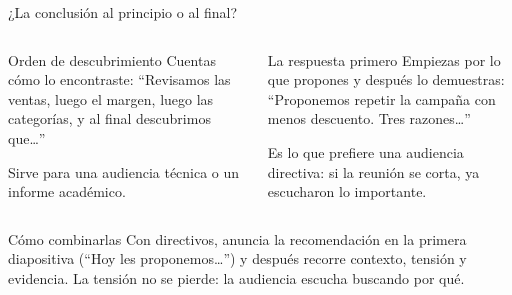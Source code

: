 \documentclass[aspectratio=169,11pt]{beamer}
\begin{document}
\begin{frame}[t]{¿La conclusión al principio o al final?}
  \begin{columns}[T,onlytextwidth]
    \begin{block}{Orden de descubrimiento}
      \footnotesize Cuentas cómo lo encontraste: ``Revisamos las ventas,
      luego el margen, luego las categorías, y al final descubrimos
      que\ldots''
      \vspace{3pt}

      Sirve para una audiencia técnica o un informe académico.
    \end{block}
    \begin{exampleblock}{La respuesta primero}
      \footnotesize Empiezas por lo que propones y después lo demuestras:
      ``Proponemos repetir la campaña con menos descuento. Tres razones\ldots''
      \vspace{3pt}

      Es lo que prefiere una audiencia directiva: si la reunión se corta,
      ya escucharon lo importante.
    \end{exampleblock}
  \end{columns}
  \vspace{0.2cm}
  \begin{block}{Cómo combinarlas}
    \footnotesize Con directivos, anuncia la recomendación en la primera
    diapositiva (``Hoy les proponemos\ldots'') y después recorre contexto,
    tensión y evidencia. La tensión no se pierde: la audiencia escucha
    buscando por qué.
  \end{block}
\end{frame}
\end{document}
